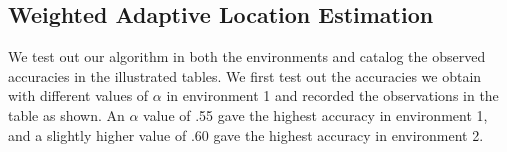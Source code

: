 \documentclass[twocolumn, 11pt]{IEEEtran}
\begin{document}
\subsection{Weighted Adaptive Location Estimation}
We test out our algorithm in both the environments and catalog the observed accuracies in the illustrated tables. We first test out the accuracies we obtain with different values of $\alpha$ in environment 1 and recorded the observations in the table as shown. An $\alpha$ value of .55 gave the highest accuracy in environment 1, and a slightly higher value of .60 gave the highest accuracy in environment 2. 

\end{document}
